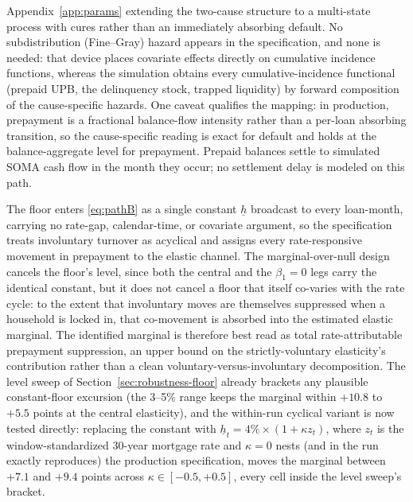 \documentclass[12pt]{article}
\begin{document}
Appendix~\ref{app:params} extending the two-cause structure to a multi-state process with cures rather than an immediately absorbing default. No subdistribution (Fine--Gray) hazard \citep{fine1999} appears in the specification, and none is needed: that device places covariate effects directly on cumulative incidence functions, whereas the simulation obtains every cumulative-incidence functional (prepaid UPB, the delinquency stock, trapped liquidity) by forward composition of the cause-specific hazards. One caveat qualifies the mapping: in production, prepayment is a fractional balance-flow intensity rather than a per-loan absorbing transition, so the cause-specific reading is exact for default and holds at the balance-aggregate level for prepayment. Prepaid balances settle to simulated SOMA cash flow in the month they occur; no settlement delay is modeled on this path.

The floor enters \eqref{eq:pathB} as a single constant $\underline{h}$ broadcast to every loan-month, carrying no rate-gap, calendar-time, or covariate argument, so the specification treats involuntary turnover as acyclical and assigns every rate-responsive movement in prepayment to the elastic channel. The marginal-over-null design cancels the floor's level, since both the central and the $\beta_1 = 0$ legs carry the identical constant, but it does not cancel a floor that itself co-varies with the rate cycle: to the extent that involuntary moves are themselves suppressed when a household is locked in, that co-movement is absorbed into the estimated elastic marginal. The identified marginal is therefore best read as total rate-attributable prepayment suppression, an upper bound on the strictly-voluntary elasticity's contribution rather than a clean voluntary-versus-involuntary decomposition. The level sweep of Section~\ref{sec:robustness-floor} already brackets any plausible constant-floor excursion (the 3--5\% range keeps the marginal within $+10.8$ to $+5.5$ points at the central elasticity), and the within-run cyclical variant is now tested directly: replacing the constant with $\underline{h}_t = 4\% \times (1 + \kappa z_t)$, where $z_t$ is the window-standardized 30-year mortgage rate and $\kappa = 0$ nests (and in the run exactly reproduces) the production specification, moves the marginal between $+7.1$ and $+9.4$ points across $\kappa \in [-0.5, +0.5]$, every cell inside the level sweep's bracket.
\end{document}
